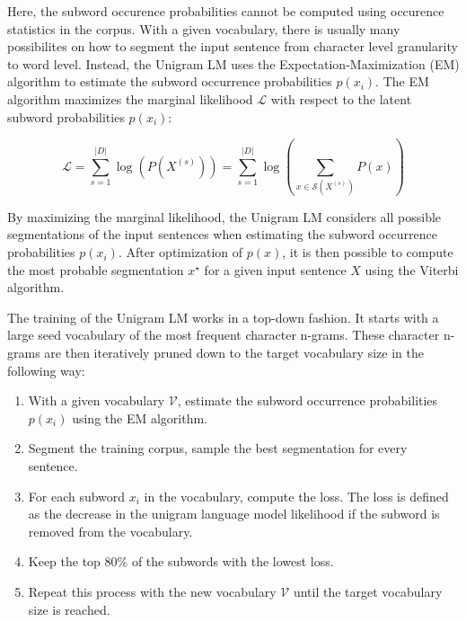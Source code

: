 Here, the subword occurence probabilities cannot be computed using occurence statistics in the corpus. With a given vocabulary, there is usually many possibilites on how to segment the input sentence from character level granularity to word level. Instead, the Unigram LM uses the Expectation-Maximization (EM) algorithm to estimate the subword occurrence probabilities $p(x_i)$. The EM algorithm maximizes the marginal likelihood $\mathcal{L}$ with respect to the latent subword probabilities $p(x_i)$:

\begin{equation}
    \mathcal{L} = \sum_{s=1}^{|D|} \log (P(X^{(s)})) = \sum_{s=1}^{|D|} \log( \sum_{x \in \mathcal{S}(X^{(s)})} P(x) )
\end{equation}

By maximizing the marginal likelihood, the Unigram LM considers all possible segmentations of the input sentences when estimating the subword occurrence probabilities $p(x_i)$. After optimization of $p(x)$, it is then possible to compute the most probable segmentation $x^\star$ for a given input sentence $X$ using the Viterbi algorithm.

The training of the Unigram LM works in a top-down fashion. It starts with a large seed vocabulary of the most frequent character n-grams. These character n-grams are then iteratively pruned down to the target vocabulary size in the following way:

\begin{enumerate}
    \item With a given vocabulary $\mathcal{V}$, estimate the subword occurrence probabilities $p(x_i)$ using the EM algorithm.
    \item Segment the training corpus, sample the best segmentation for every sentence.
    \item For each subword $x_i$ in the vocabulary, compute the loss. The loss is defined as the decrease in the unigram language model likelihood if the subword is removed from the vocabulary.
    \item Keep the top 80\% of the subwords with the lowest loss.
    \item Repeat this process with the new vocabulary $\mathcal{V}$ until the target vocabulary size is reached.
\end{enumerate}




